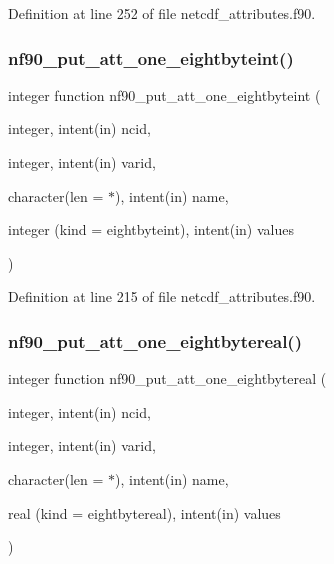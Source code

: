 Definition at line 252 of file netcdf\+\_\+attributes.\+f90.

\mbox{\label{netcdf__attributes_8f90_a9e5f3db46f366edbe06f37c07778581f}} 
\subsubsection{\texorpdfstring{nf90\+\_\+put\+\_\+att\+\_\+one\+\_\+eightbyteint()}{nf90\_put\_att\_one\_eightbyteint()}}
{\footnotesize\ttfamily integer function nf90\+\_\+put\+\_\+att\+\_\+one\+\_\+eightbyteint (\begin{DoxyParamCaption}\item[{integer, intent(in)}]{ncid,  }\item[{integer, intent(in)}]{varid,  }\item[{character(len = $\ast$), intent(in)}]{name,  }\item[{integer (kind = eightbyteint), intent(in)}]{values }\end{DoxyParamCaption})}



Definition at line 215 of file netcdf\+\_\+attributes.\+f90.

\mbox{\label{netcdf__attributes_8f90_ab3ab0461f63ffd2f1067ed51a7a75aa0}} 
\subsubsection{\texorpdfstring{nf90\+\_\+put\+\_\+att\+\_\+one\+\_\+eightbytereal()}{nf90\_put\_att\_one\_eightbytereal()}}
{\footnotesize\ttfamily integer function nf90\+\_\+put\+\_\+att\+\_\+one\+\_\+eightbytereal (\begin{DoxyParamCaption}\item[{integer, intent(in)}]{ncid,  }\item[{integer, intent(in)}]{varid,  }\item[{character(len = $\ast$), intent(in)}]{name,  }\item[{real (kind = eightbytereal), intent(in)}]{values }\end{DoxyParamCaption})}



